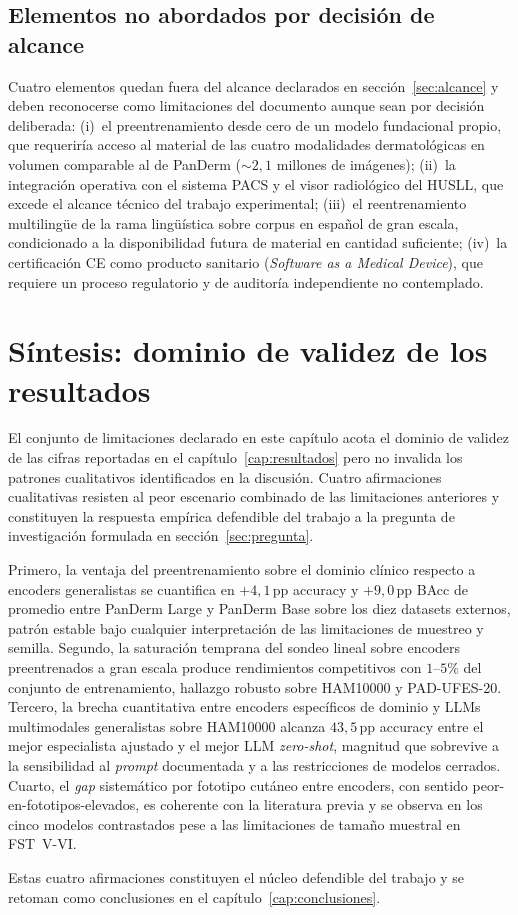 \subsection{Elementos no abordados por decisión de alcance}
\label{sec:lim-fuera}

Cuatro elementos quedan fuera del alcance declarados en
secci\'on~\ref{sec:alcance} y deben reconocerse como limitaciones del
documento aunque sean por decisión deliberada: (i)~el
preentrenamiento desde cero de un modelo fundacional propio, que
requeriría acceso al material de las cuatro modalidades
dermatológicas en volumen comparable al de PanDerm
($\sim 2{,}1$ millones de imágenes); (ii)~la integración
operativa con el sistema PACS y el visor radiológico del HUSLL,
que excede el alcance técnico del trabajo experimental;
(iii)~el reentrenamiento multilingüe de la rama lingüística sobre
corpus en español de gran escala, condicionado a la disponibilidad
futura de material en cantidad suficiente; (iv)~la certificación
CE como producto sanitario (\emph{Software as a Medical Device}),
que requiere un proceso regulatorio y de auditoría independiente
no contemplado.

\section{Síntesis: dominio de validez de los resultados}
\label{sec:lim-sintesis}

El conjunto de limitaciones declarado en este capítulo acota el
dominio de validez de las cifras reportadas en el
capítulo~\ref{cap:resultados} pero no invalida los patrones
cualitativos identificados en la discusión. Cuatro afirmaciones
cualitativas resisten al peor escenario combinado de las
limitaciones anteriores y constituyen la respuesta empírica
defendible del trabajo a la pregunta de investigación formulada
en secci\'on~\ref{sec:pregunta}.

Primero, la ventaja del preentrenamiento sobre el dominio clínico
respecto a encoders generalistas se cuantifica en
$+4{,}1$\,pp accuracy y $+9{,}0$\,pp BAcc de promedio entre
PanDerm Large y PanDerm Base sobre los diez datasets externos,
patrón estable bajo cualquier interpretación de las
limitaciones de muestreo y semilla. Segundo, la saturación
temprana del sondeo lineal sobre encoders preentrenados a gran
escala produce rendimientos competitivos con $1$--$5\%$ del
conjunto de entrenamiento, hallazgo robusto sobre HAM10000 y
PAD-UFES-20. Tercero, la brecha cuantitativa entre encoders
específicos de dominio y LLMs multimodales generalistas sobre
HAM10000 alcanza $43{,}5$\,pp accuracy entre el mejor
especialista ajustado y el mejor LLM \emph{zero-shot}, magnitud
que sobrevive a la sensibilidad al \emph{prompt} documentada y a
las restricciones de modelos cerrados. Cuarto, el \emph{gap}
sistemático por fototipo cutáneo entre encoders, con sentido
peor-en-fototipos-elevados, es coherente con la literatura previa
y se observa en los cinco modelos contrastados pese a las
limitaciones de tamaño muestral en FST~V-VI.

Estas cuatro afirmaciones constituyen el núcleo defendible del
trabajo y se retoman como conclusiones en el
capítulo~\ref{cap:conclusiones}.
